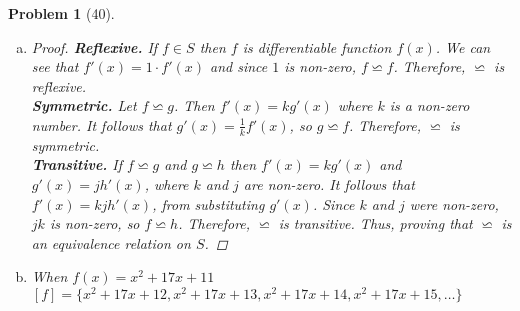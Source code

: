 \documentclass{article}
\theoremstyle{problem}
\newtheorem{prob}{Problem}
\theoremstyle{plain}
\theoremstyle{remark}
\begin{document}
\begin{prob}[40]\ \\[-1cm]
  \begin{enumerate}[a)]
  \item \begin{proof}
      \textbf{Reflexive.} If $f \in S$ then $f$ is differentiable function $f(x)$. We can see that $f'(x) = 1 \cdot f'(x)$ and since $1$ is non-zero, $f \backsimeq f$. Therefore, $\backsimeq$ is reflexive.\\
    \textbf{Symmetric.} Let $f \backsimeq g$. Then $f'(x) = k g'(x)$ where $k$ is a non-zero number. It follows that $g'(x) = \frac{1}{k} f'(x)$, so $g \backsimeq f$. Therefore, $\backsimeq$ is symmetric.\\
    \textbf{Transitive.} If $f \backsimeq g$ and $g \backsimeq h$ then $f'(x) = k g'(x)$ and $g'(x) = j h'(x)$, where $k$ and $j$ are non-zero. It follows that $f'(x) = k j h'(x)$, from substituting $g'(x)$. Since $k$ and $j$ were non-zero, $jk$ is non-zero, so $f \backsimeq h$. Therefore, $\backsimeq$ is transitive.
    Thus, proving that $\backsimeq$ is an equivalence relation on $S$.
  \end{proof}
  \item When $f(x) = x^2 + 17x + 11$\\ $[f] = \{x^2 + 17x + 12, x^2 + 17x + 13, x^2 + 17x + 14, x^2 + 17x + 15,\ldots\}$
\end{enumerate}
\end{prob}
%
\end{document}
